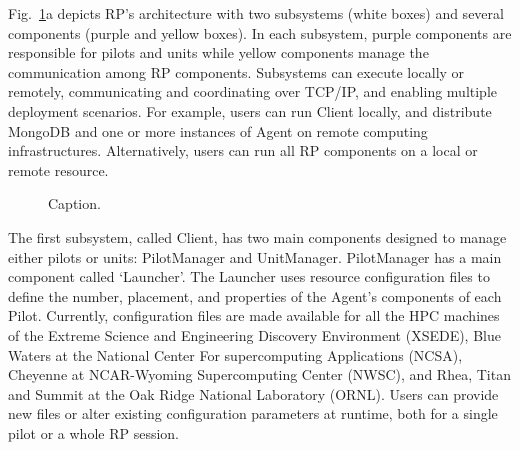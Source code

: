 \documentclass[preprint,12pt, a4paper]{elsarticle}
\begin{document}
Fig.~\ref{fig:archs}a depicts RP's architecture with two subsystems (white
boxes) and several components (purple and yellow boxes). In each subsystem,
purple components are responsible for pilots and units while yellow
components manage the communication among RP components. Subsystems can
execute locally or remotely, communicating and coordinating over TCP/IP\@,
and enabling multiple deployment scenarios. For example, users can run Client
locally, and distribute MongoDB and one or more instances of Agent on remote
computing infrastructures. Alternatively, users can run all RP components on
a local or remote resource.

\begin{figure}
    \centering
    \qquad
    \caption{Caption. }\label{fig:archs}
\end{figure}

The first subsystem, called Client, has two main components designed to
manage either pilots or units: PilotManager and UnitManager. PilotManager has
a main component called `Launcher'. The Launcher uses resource configuration
files to define the number, placement, and properties of the Agent's
components of each Pilot. Currently, configuration files are made available
for all the HPC machines of the Extreme Science and Engineering Discovery
Environment (XSEDE), Blue Waters at the National Center For supercomputing
Applications (NCSA), Cheyenne at NCAR-Wyoming Supercomputing Center (NWSC),
and Rhea, Titan and Summit at the Oak Ridge National Laboratory (ORNL). Users
can provide new files or alter existing configuration parameters at runtime,
both for a single pilot or a whole RP session.
\end{document}
